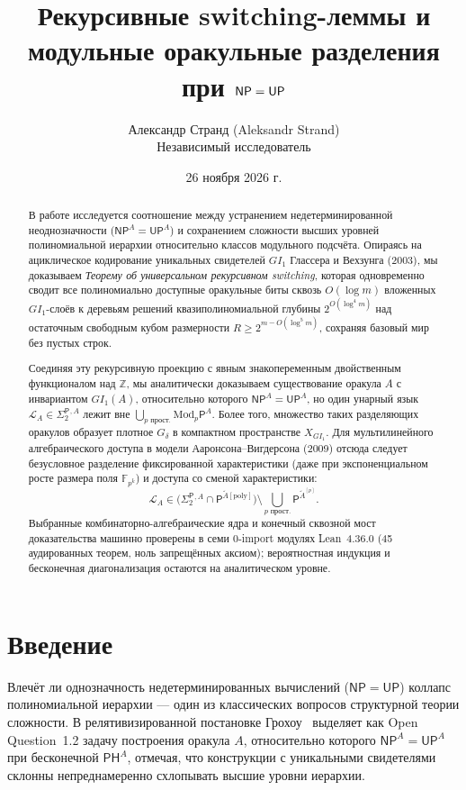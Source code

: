 \documentclass[11pt,a4paper]{article}
\title{\textbf{Рекурсивные switching-леммы и модульные оракульные разделения при $\NP = \UP$}}
\author{Александр Странд (Aleksandr Strand)\\ \small Независимый исследователь}
\date{26 ноября 2026 г.}
\theoremstyle{definition}
\theoremstyle{remark}
\newcommand{\Pcl}{\mathsf{P}}
\newcommand{\NP}{\mathsf{NP}}
\newcommand{\UP}{\mathsf{UP}}
\newcommand{\PH}{\mathsf{PH}}
\newcommand{\Modp}{\mathrm{Mod}_p\mathsf{P}}
\newcommand{\SigTwo}{\Sigma_2^{\mathsf{P}}}
\newcommand{\F}{\mathbb{F}}
\newcommand{\Z}{\mathbb{Z}}
\newcommand{\GI}{GI_1}
\begin{document}
\maketitle

\begin{abstract}
В работе исследуется соотношение между устранением недетерминированной неоднозначности ($\NP^A = \UP^A$) и сохранением сложности высших уровней полиномиальной иерархии относительно классов модульного подсчёта. Опираясь на ациклическое кодирование уникальных свидетелей $\GI$ Глассера и Вехзунга (2003), мы доказываем \emph{Теорему об универсальном рекурсивном switching}, которая одновременно сводит все полиномиально доступные оракульные биты сквозь $O(\log m)$ вложенных $\GI$-слоёв к деревьям решений квазиполиномиальной глубины $2^{O(\log^4 m)}$ над остаточным свободным кубом размерности $R \ge 2^{m - O(\log^5 m)}$, сохраняя базовый мир без пустых строк.

Соединяя эту рекурсивную проекцию с явным знакопеременным двойственным функционалом над $\Z$, мы аналитически доказываем существование оракула $A$ с инвариантом $\GI(A)$, относительно которого $\NP^A = \UP^A$, но один унарный язык $\mathcal{L}_A \in \SigTwo{}^{,A}$ лежит вне $\bigcup_{p\text{ прост.}} \Modp^A$. Более того, множество таких разделяющих оракулов образует плотное $G_\delta$ в компактном пространстве $X_{\GI}$. Для мультилинейного алгебраического доступа в модели Ааронсона--Вигдерсона (2009) отсюда следует безусловное разделение фиксированной характеристики (даже при экспоненциальном росте размера поля $\F_{p^k}$) и доступа со сменой характеристики:
\[
  \mathcal{L}_A \in \bigl(\SigTwo{}^{,A} \cap \Pcl^{\widetilde{A}[\mathrm{poly}]}\bigr) \setminus \bigcup_{p\text{ прост.}} \Pcl^{\widetilde{A}^{[p]}}.
\]
Выбранные комбинаторно-алгебраические ядра и конечный сквозной мост доказательства машинно проверены в семи 0-import модулях Lean~4.36.0 (45 аудированных теорем, ноль запрещённых аксиом); вероятностная индукция и бесконечная диагонализация остаются на аналитическом уровне.
\end{abstract}

\section{Введение}

Влечёт ли однозначность недетерминированных вычислений ($\NP = \UP$) коллапс полиномиальной иерархии — один из классических вопросов структурной теории сложности. В релятивизированной постановке Грохоу~\cite{Grochow2023} выделяет как Open Question~1.2 задачу построения оракула $A$, относительно которого $\NP^A = \UP^A$ при бесконечной $\PH^A$, отмечая, что конструкции с уникальными свидетелями склонны непреднамеренно схлопывать высшие уровни иерархии.
\end{document}

